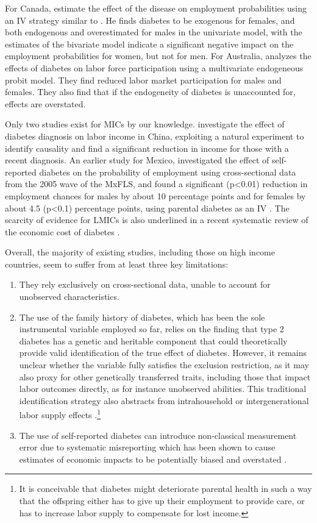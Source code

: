 \documentclass[12pt,english,british]{article}
\begin{document}
For Canada, \citet{Latif2009} estimate the effect of the disease on employment probabilities using an \ac{IV} strategy similar to \citet{Brown2005}. He finds diabetes to be exogenous for females, and both endogenous and overestimated for males in the univariate model, with the estimates of the bivariate model indicate a significant negative impact on the employment probabilities for women, but not for men. 
For Australia, \cite{Zhang2009} analyzes the effects of diabetes on labor force participation using a multivariate endogeneous probit model. They find reduced labor market participation for males and females. They also find that if the endogeneity of diabetes is unaccounted for, effects are overstated. 

Only two studies exist for \ac{MICs} by our knowledge. \citet{Liu2014} investigate the effect of diabetes diagnosis on labor income in China, exploiting a natural experiment to identify causality and find a significant reduction in income for those with a recent diagnosis. An earlier study for Mexico, investigated the effect of self-reported diabetes on the probability of employment using cross-sectional data from the 2005 wave of the \ac{MxFLS}, and found a significant (p<0.01) reduction in employment chances for males by about 10 percentage points and for females by about 4.5 (p<0.1) percentage points, using parental diabetes as an \ac{IV} \citep{Seuring2015}. The scarcity of evidence for \ac{LMICs} is also underlined in a recent systematic review of the economic cost of diabetes \citep{Seuring2015a}. 


Overall, the majority of existing studies, including those on high income countries, seem to suffer from at least three key limitations: 
\begin{enumerate}
\item  They rely exclusively on cross-sectional data, unable to account for unobserved characteristics.
\item The use of the family history of diabetes, which has been the sole instrumental variable employed so far, relies on the finding that type 2 diabetes has a genetic and heritable component that could theoretically provide valid identification of the true effect of diabetes. However, it remains unclear whether the variable fully satisfies the exclusion restriction, as it may also proxy for other genetically transferred traits, including those that impact labor outcomes directly, as for instance unobserved abilities. This traditional identification strategy also abstracts from intrahousehold or intergenerational labor supply effects \citep{Seuring2015}.\footnote{It is conceivable that diabetes might deteriorate parental health in such a way that the offspring either has to give
up their employment to provide care, or has to increase labor supply to compensate for lost income.}
\item The use of self-reported diabetes can introduce non-classical measurement error due to systematic misreporting which has been shown to cause estimates of economic impacts to be potentially biased and overstated  \citep{Cawley2015,ONeill2013,Perks2015}.
\end{enumerate}
\end{document}
